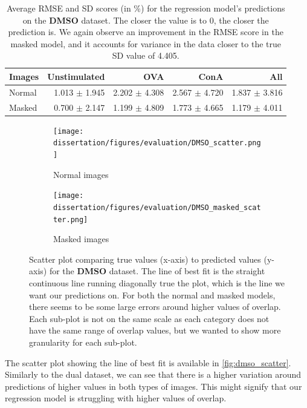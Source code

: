 \begin{table}[h!]
\centering
\caption{Average RMSE and SD scores (in \%) for the regression model's predictions on the \textbf{DMSO} dataset. The closer the value is to 0, the closer the prediction is. We again observe an improvement in the RMSE score in the masked model, and it accounts for variance in the data closer to the true SD value of 4.405.}
\label{tab:dmso_rmse}
\begin{tabular}{l|rrr|r}
\rowcolor[HTML]{EFEFEF}
\textbf{Images} & \cellcolor[HTML]{FFCCC9}\textbf{Unstimulated} & \cellcolor[HTML]{C9FFCB}\textbf{OVA} & \cellcolor[HTML]{96FFFB}\textbf{ConA} & \textbf{All} \\ \hline
Normal      & 1.013 $\pm$ 1.945  & 2.202 $\pm$ 4.308   & 2.567 $\pm$ 4.720  &   1.837 $\pm$ 3.816  \\ \hline
Masked      &    0.700 $\pm$ 2.147          & 1.199 $\pm$ 4.809  &  1.773 $\pm$ 4.665   &   1.179 $\pm$ 4.011 
\end{tabular}
\end{table}

\begin{figure}[h!]
    \centering
    \begin{subfigure}{0.8\textwidth}
        \texttt{[image: dissertation/figures/evaluation/DMSO\_scatter.png]}
        \caption{Normal images}
    \end{subfigure}
    \begin{subfigure}{0.8\textwidth}
        \texttt{[image: dissertation/figures/evaluation/DMSO\_masked\_scatter.png]}
        \caption{Masked images}
    \end{subfigure}
    \caption{Scatter plot comparing true values (x-axis) to predicted values (y-axis) for the \textbf{DMSO} dataset. The line of best fit is the straight continuous line running diagonally true the plot, which is the line we want our predictions on. For both the normal and masked models, there seems to be some large errors around higher values of overlap. Each sub-plot is not on the same scale as each category does not have the same range of overlap values, but we wanted to show more granularity for each sub-plot.}
    \label{fig:dmso_scatter}
\end{figure}

The scatter plot showing the line of best fit is available in \autoref{fig:dmso_scatter}. Similarly to the dual dataset, we can see that there is a higher variation around predictions of higher values in both types of images. This might signify that our regression model is struggling with higher values of overlap. 


